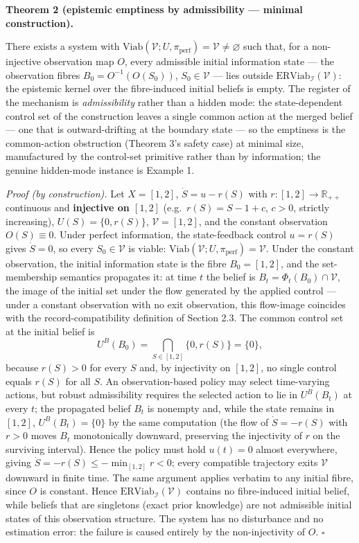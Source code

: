 \documentclass[11pt]{article}
\begin{document}
\textbf{Theorem 2 (epistemic emptiness by admissibility --- minimal
construction).}

There exists a system with
\(\mathrm{Viab}(\mathcal{V}; U, \pi_{\mathrm{perf}}) = \mathcal{V} \neq \varnothing\)
such that, for a non-injective observation map \(O\), every admissible
initial information state --- the observation fibres
\(B_0 = O^{-1}(O(S_0))\), \(S_0 \in \mathcal{V}\) --- lies outside
\(\mathrm{ERViab}_{\mathcal{I}}(\mathcal{V})\): the epistemic kernel
over the fibre-induced initial beliefs is empty. The register of the
mechanism is \emph{admissibility} rather than a hidden mode: the
state-dependent control set of the construction leaves a single common
action at the merged belief --- one that is outward-drifting at the
boundary state --- so the emptiness is the common-action obstruction
(Theorem 3's safety case) at minimal size, manufactured by the
control-set primitive rather than by information; the genuine
hidden-mode instance is Example 1.

\emph{Proof (by construction).} Let \(X = [1,2]\), \(\dot S = u - r(S)\)
with \(r : [1,2] \to \mathbb{R}_{++}\) continuous and \textbf{injective
on \([1,2]\)} (e.g.~\(r(S) = S - 1 + c\), \(c > 0\), strictly
increasing), \(U(S) = \{0, r(S)\}\), \(\mathcal{V} = [1,2]\), and the
constant observation \(O(S) \equiv 0\). Under perfect information, the
state-feedback control \(u = r(S)\) gives \(\dot S = 0\), so every
\(S_0 \in \mathcal{V}\) is viable:
\(\mathrm{Viab}(\mathcal{V}; U, \pi_{\mathrm{perf}}) = \mathcal{V}\).
Under the constant observation, the initial information state is the
fibre \(B_0 = [1,2]\), and the set-membership semantics propagates it:
at time \(t\) the belief is \(B_t = \Phi_t(B_0) \cap \mathcal{V}\), the
image of the initial set under the flow generated by the applied control
--- under a constant observation with no exit observation, this
flow-image coincides with the record-compatibility definition of Section
2.3. The common control set at the initial belief is
\[U^B(B_0) = \bigcap_{S \in [1,2]} \{0, r(S)\} = \{0\},\] because
\(r(S) > 0\) for every \(S\) and, by injectivity on \([1,2]\), no single
control equals \(r(S)\) for all \(S\). An observation-based policy may
select time-varying actions, but robust admissibility requires the
selected action to lie in \(U^B(B_t)\) at every \(t\); the propagated
belief \(B_t\) is nonempty and, while the state remains in \([1,2]\),
\(U^B(B_t) = \{0\}\) by the same computation (the flow of
\(\dot S = -r(S)\) with \(r > 0\) moves \(B_t\) monotonically downward,
preserving the injectivity of \(r\) on the surviving interval). Hence
the policy must hold \(u(t) = 0\) almost everywhere, giving
\(\dot S = -r(S) \le -\min_{[1,2]} r < 0\); every compatible trajectory
exits \(\mathcal{V}\) downward in finite time. The same argument applies
verbatim to any initial fibre, since \(O\) is constant. Hence
\(\mathrm{ERViab}_{\mathcal{I}}(\mathcal{V})\) contains no fibre-induced
initial belief, while beliefs that are singletons (exact prior
knowledge) are not admissible initial states of this observation
structure. The system has no disturbance and no estimation error: the
failure is caused entirely by the non-injectivity of \(O\). \ensuremath{\square}
\end{document}
